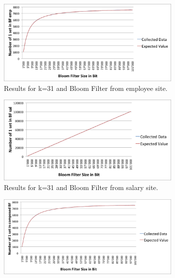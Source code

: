 \documentclass[12]{scrartcl}
\begin{document}
\begin{figure}[H]
	\begin{subfigure}[t]{\textwidth}
		\begin{center}
			\includegraphics[scale=0.3]{res/31-emp.png}
		\end{center}
		\caption{Results for k=31 and Bloom Filter from employee site.}
	\end{subfigure}
	\begin{subfigure}[t]{\textwidth}
		\begin{center}
			\includegraphics[scale=0.3]{res/31-sal.png}
		\end{center}
		\caption{Results for k=31 and Bloom Filter from salary site.}
	\end{subfigure}
	\begin{subfigure}[t]{\textwidth}
		\begin{center}
			\includegraphics[scale=0.3]{res/31-composed.png}

\end{center}
\end{subfigure}
\end{figure}
\end{document}

